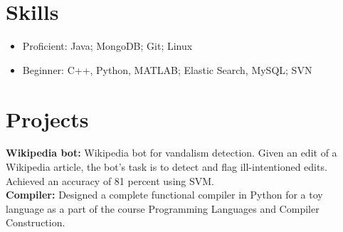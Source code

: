 \documentclass[letterpaper]{article}
\begin{document}
\section*{Skills}
\begin{itemize}
\item Proficient: Java; MongoDB; Git; Linux   
\vspace{-2mm}
\item Beginner: C++, Python, MATLAB; Elastic Search, MySQL; SVN
\end{itemize}

\section*{Projects}
\textbf{Wikipedia bot:}
Wikipedia bot for vandalism detection. Given an edit of a Wikipedia article, the bot's task is to detect and flag ill-intentioned edits. Achieved an accuracy of 81 percent using SVM.\\
\textbf{Compiler:}
Designed a complete functional compiler in Python for a toy language as a part of the course Programming Languages and Compiler Construction.
\end{document}
